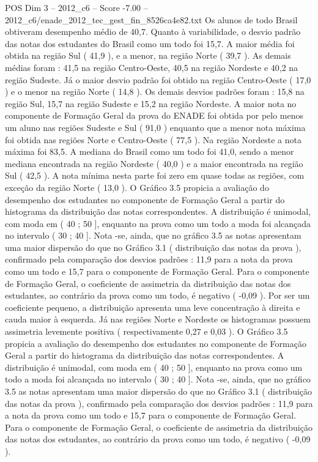 \begin{textsample}{POS Dim 3 – 2012\_c6 – Score -7.00 – 2012\_c6/enade\_2012\_tec\_gest\_fin\_8526ca4e82.txt}
Os alunos de todo Brasil obtiveram desempenho médio de 40,7.
Quanto à variabilidade, o desvio padrão das notas dos estudantes do Brasil como um todo foi 15,7.
A maior média foi obtida na região Sul ( 41,9 ), e a menor, na região Norte ( 39,7 ).
As demais médias foram : 41,5 na região Centro-Oeste, 40,5 na região Nordeste e 40,2 na região Sudeste.
Já o maior desvio padrão foi obtido na região Centro-Oeste ( 17,0 ) e o menor na região Norte ( 14,8 ).
Os demais desvios padrões foram : 15,8 na região Sul, 15,7 na região Sudeste e 15,2 na região Nordeste.
A maior nota no componente de Formação Geral da prova do ENADE foi obtida por pelo menos um aluno nas regiões Sudeste e Sul ( 91,0 ) enquanto que a menor nota máxima foi obtida nas regiões Norte e Centro-Oeste ( 77,5 ).
Na região Nordeste a nota máxima foi 83,5.
A mediana do Brasil como um todo foi 41,0, sendo a menor mediana encontrada na região Nordeste ( 40,0 ) e a maior encontrada na região Sul ( 42,5 ).
A nota mínima nesta parte foi zero em quase todas as regiões, com exceção da região Norte ( 13,0 ).
O Gráfico 3.5 propicia a avaliação do desempenho dos estudantes no componente de Formação Geral a partir do histograma da distribuição das notas correspondentes.
A distribuição é unimodal, com moda em ( 40 ; 50 ], enquanto na prova como um todo a moda foi alcançada no intervalo ( 30 ; 40 ].
Nota -se, ainda, que no gráfico 3.5 as notas apresentam uma maior dispersão do que no Gráfico 3.1 ( distribuição das notas da prova ), confirmado pela comparação dos desvios padrões : 11,9 para a nota da prova como um todo e 15,7 para o componente de Formação Geral.
Para o componente de Formação Geral, o coeficiente de assimetria da distribuição das notas dos estudantes, ao contrário da prova como um todo, é negativo ( -0,09 ).
Por ser um coeficiente pequeno, a distribuição apresenta uma leve concentração à direita e cauda maior à esquerda.
Já nas regiões Norte e Nordeste os histogramas possuem assimetria levemente positiva ( respectivamente 0,27 e 0,03 ).
O Gráfico 3.5 propicia a avaliação do desempenho dos estudantes no componente de Formação Geral a partir do histograma da distribuição das notas correspondentes.
A distribuição é unimodal, com moda em ( 40 ; 50 ], enquanto na prova como um todo a moda foi alcançada no intervalo ( 30 ; 40 ].
Nota -se, ainda, que no gráfico 3.5 as notas apresentam uma maior dispersão do que no Gráfico 3.1 ( distribuição das notas da prova ), confirmado pela comparação dos desvios padrões : 11,9 para a nota da prova como um todo e 15,7 para o componente de Formação Geral.
Para o componente de Formação Geral, o coeficiente de assimetria da distribuição das notas dos estudantes, ao contrário da prova como um todo, é negativo ( -0,09 ).

\end{textsample}
